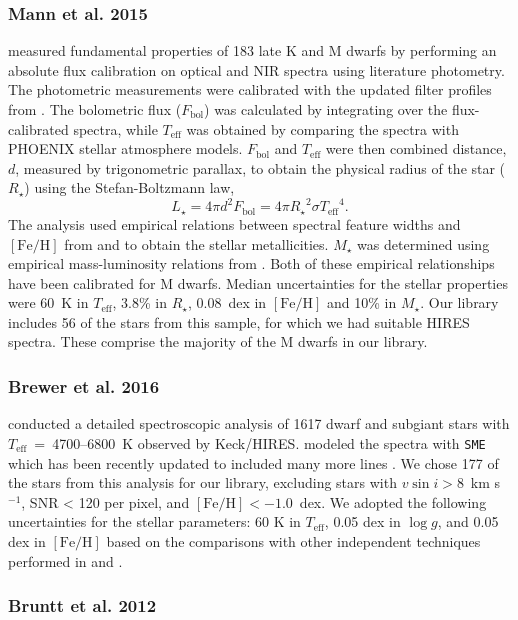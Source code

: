 \documentclass[preprint2]{aastex6}
\newcommand{\Mstar}{\ensuremath{M_{\star}}\xspace}
\newcommand{\Rstar}{\ensuremath{R_{\star}}\xspace}
\newcommand{\Lstar}{\ensuremath{L_{\star}}\xspace}
\newcommand{\fe}{\ensuremath{\mathrm{[Fe/H]}}\xspace}
\newcommand{\teff}{\ensuremath{T_{\mathrm{eff}}}\xspace}
\newcommand{\logg}{\ensuremath{\log g}\xspace}
\newcommand{\vsini}{\ensuremath{v \sin i}\xspace}
\newcommand{\Fbol}{\ensuremath{F_{\mathrm{bol}}}\xspace}
\newcommand{\kms}{km s$^{-1}$\xspace}
\newcommand{\mannnum}{56\xspace}
\newcommand{\brewernum}{177\xspace}
\begin{document}
\subsubsection{Mann et al. 2015} \label{sec:sample_mann}
\cite{Mann15} measured fundamental properties of 183 late K and M dwarfs by performing an absolute flux calibration on optical and NIR spectra using literature photometry. The photometric measurements were calibrated with the updated filter profiles from \cite{Mann2015b}. The bolometric flux (\Fbol) was calculated by integrating over the flux-calibrated spectra, while \teff was obtained by comparing the spectra with PHOENIX stellar atmosphere models. \Fbol and \teff were then combined distance, $d$, measured by trigonometric parallax, to obtain the physical radius of the star (\Rstar) using the Stefan-Boltzmann law,
%
\[
\Lstar = 4 \pi d^2 \Fbol = 4 \pi \Rstar^2 \sigma \teff^4.
\]
%
The analysis used empirical relations between spectral feature widths and \fe from \cite{Mann2013} and \cite{Mann2014} to obtain the stellar metallicities. \Mstar was determined using empirical mass-luminosity relations from \cite{Delfosse2000}. Both of these empirical relationships have been calibrated for M dwarfs. Median uncertainties for the stellar properties were 60~K in \teff, 3.8\% in \Rstar, 0.08~dex in \fe and 10\% in \Mstar. Our library includes \mannnum of the stars from this sample, for which we had suitable HIRES spectra. These comprise the majority of the M dwarfs in our library.

\subsubsection{Brewer et al. 2016} 
\label{sec:sample_brewer}
\cite{Brewer16} conducted a detailed spectroscopic analysis of 1617 dwarf and subgiant stars with \teff~=~4700--6800~K observed by Keck/HIRES. \cite{Brewer16} modeled the spectra with {\tt SME} \citep{Valenti96} which has been recently updated to included many more lines \citep{Brewer15}. We chose \brewernum of the stars from this analysis for our library, excluding stars with $\vsini > 8 $~\kms, SNR < 120 per pixel, and $\fe < -1.0$~dex. We adopted the following uncertainties for the stellar parameters: 60 K in \teff, 0.05 dex in \logg, and 0.05 dex in \fe based on the comparisons with other independent techniques performed in \cite{Brewer15} and \cite{Brewer16}.

\subsubsection{Bruntt et al. 2012} 
\label{sec:sample_asteroseismic}
\end{document}
